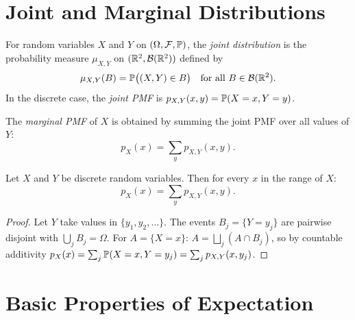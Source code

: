 \documentclass[11pt,a4paper]{article}
\begin{document}
\section{Joint and Marginal Distributions}
\label{sec:joint_marginal}

\begin{definition}
\label{def:joint}
For random variables $X$ and $Y$ on $(\Omega, \mathcal{F}, \mathbb{P})$, the
\emph{joint distribution} is the probability measure $\mu_{X,Y}$ on
$(\mathbb{R}^2, \mathcal{B}(\mathbb{R}^2))$ defined by
\begin{equation}
  \mu_{X,Y}(B) = \mathbb{P}\bigl((X, Y) \in B\bigr)
  \quad \text{for all } B \in \mathcal{B}(\mathbb{R}^2).
\end{equation}
In the discrete case, the \emph{joint PMF} is
$p_{X,Y}(x,y) = \mathbb{P}(X = x, Y = y)$.
\end{definition}

\begin{definition}
\label{def:marginal}
The \emph{marginal PMF} of $X$ is obtained by summing the joint PMF over
all values of $Y$:
\begin{equation}
  p_X(x) = \sum_y p_{X,Y}(x, y).
  \label{eq:marginal_def}
\end{equation}
\end{definition}

\begin{proposition}
\label{prop:marginalization}
Let $X$ and $Y$ be discrete random variables. Then for every $x$ in the
range of $X$:
\begin{equation}
  p_X(x) = \sum_y p_{X,Y}(x, y).
\end{equation}
\end{proposition}

\begin{proof}
Let $Y$ take values in $\{y_1, y_2, \ldots\}$. The events
$B_j = \{Y = y_j\}$ are pairwise disjoint with $\bigcup_j B_j = \Omega$.
For $A = \{X = x\}$: $A = \bigsqcup_j (A \cap B_j)$, so by countable
additivity $p_X(x) = \sum_j \mathbb{P}(X = x, Y = y_j)
= \sum_j p_{X,Y}(x, y_j)$.
\end{proof}


\section{Basic Properties of Expectation}
\label{sec:expect_props}
\end{document}
